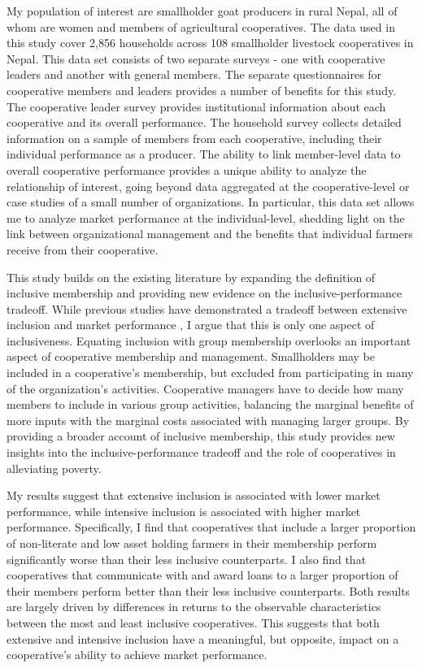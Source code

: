 \documentclass[11pt]{article}
\begin{document}
My population of interest are smallholder goat producers in rural Nepal, all of whom are women and members of agricultural cooperatives. The data used in this study cover 2,856 households across 108 smallholder livestock cooperatives in Nepal. This data set consists of two separate surveys - one with cooperative leaders and another with general members. The separate questionnaires for cooperative members and leaders provides a number of benefits for this study. The cooperative leader survey provides institutional information about each cooperative and its overall performance. The household survey collects detailed information on a sample of members from each cooperative, including their individual performance as a producer. The ability to link member-level data to overall cooperative performance provides a unique ability to analyze the relationship of interest, going beyond data aggregated at the cooperative-level or case studies of a small number of organizations. In particular, this data set allows me to analyze market performance at the individual-level, shedding light on the link between organizational management and the benefits that individual farmers receive from their cooperative. 


This study builds on the existing literature by expanding the definition of inclusive membership and providing new evidence on the inclusive-performance tradeoff. While previous studies have demonstrated a tradeoff between extensive inclusion and market performance \citep{berdegue_cooperating_2001,bernard_reaching_2009}, I argue that this is only one aspect of inclusiveness. Equating inclusion with group membership overlooks an important aspect of cooperative membership and management. Smallholders may be included in a cooperative's membership, but excluded from participating in many of the organization's activities. Cooperative managers have to decide how many members to include in various group activities, balancing the marginal benefits of more inputs with the marginal costs associated with managing larger groups. By providing a broader account of inclusive membership, this study provides new insights into the inclusive-performance tradeoff and the role of cooperatives in alleviating poverty.

My results suggest that extensive inclusion is associated with lower market performance, while intensive inclusion is associated with higher market performance. Specifically, I find that cooperatives that include a larger proportion of non-literate and low asset holding farmers in their membership perform significantly worse than their less inclusive counterparts. I also find that cooperatives that communicate with and award loans to a larger proportion of their members perform better than their less inclusive counterparts. Both results are largely driven by differences in returns to the observable characteristics between the most and least inclusive cooperatives. This suggests that both extensive and intensive inclusion have a meaningful, but opposite, impact on a cooperative's ability to achieve market performance. 
\end{document}

